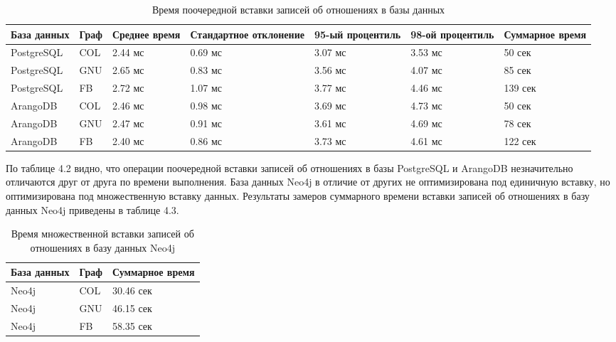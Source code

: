 \begin{table} [htbp]
    \centering\small
    \caption{Время поочередной вставки записей об отношениях в базы данных}
    \begin{tabular}{|p{3cm}|p{1cm}|p{2cm}|p{2cm}|p{2cm}|p{2cm}|p{2cm}|}
        \hline
        База данных & Граф & Среднее время & Стандартное отклонение & 95-ый процентиль & 98-ой процентиль & Суммарное время \\ \hline
        PostgreSQL  & COL  & 2.44 мс       & 0.69 мс                & 3.07 мс          & 3.53 мс          & 50 сек          \\ \hline
        PostgreSQL  & GNU  & 2.65 мс       & 0.83 мс                & 3.56 мс          & 4.07 мс          & 85 сек          \\ \hline
        PostgreSQL  & FB   & 2.72 мс       & 1.07 мс                & 3.77 мс          & 4.46 мс          & 139 сек         \\ \hline
        ArangoDB    & COL  & 2.46 мс       & 0.98 мс                & 3.69 мс          & 4.73 мс          & 50 сек          \\ \hline
        ArangoDB    & GNU  & 2.47 мс       & 0.91 мс                & 3.61 мс          & 4.69 мс          & 78 сек          \\ \hline
        ArangoDB    & FB   & 2.40 мс       & 0.86 мс                & 3.73 мс          & 4.61 мс          & 122 сек         \\ \hline
    \end{tabular}
    \normalsize
\end{table}

По таблице 4.2 видно, что операции поочередной вставки записей об отношениях в базы PostgreSQL и ArangoDB незначительно отличаются друг от друга по времени выполнения. База данных Neo4j в отличие от других не оптимизирована под единичную вставку, но оптимизирована под множественную вставку данных. Результаты замеров суммарного времени вставки записей об отношениях в базу данных Neo4j приведены в таблице 4.3.

\begin{table} [htbp]
    \centering\small
    \caption{Время множественной вставки записей об отношениях в базу данных Neo4j}
    \begin{tabular}{|l|l|l|}
        \hline
        База данных & Граф & Суммарное время \\ \hline
        Neo4j       & COL  & 30.46 сек       \\ \hline
        Neo4j       & GNU  & 46.15 сек       \\ \hline
        Neo4j       & FB   & 58.35 сек       \\ \hline
    \end{tabular}
    \normalsize
\end{table}

